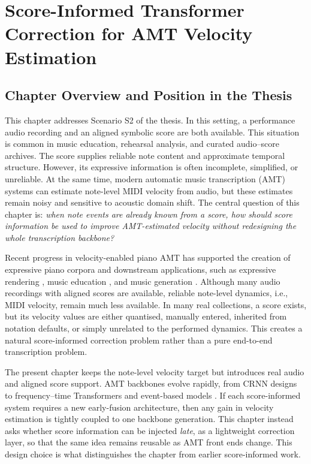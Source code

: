 \chapter{Score-Informed Transformer Correction for AMT Velocity Estimation}
\label{ch:scoreinf}

\section{Chapter Overview and Position in the Thesis}
\label{sec:scoreinf:overview}

This chapter addresses Scenario S2 of the thesis. In this setting, a performance audio recording and an aligned symbolic score are both available. This situation is common in music education, rehearsal analysis, and curated audio--score archives. The score supplies reliable note content and approximate temporal structure. However, its expressive information is often incomplete, simplified, or unreliable. At the same time, modern automatic music transcription (AMT) systems can estimate note-level MIDI velocity from audio, but these estimates remain noisy and sensitive to acoustic domain shift. The central question of this chapter is: \emph{when note events are already known from a score, how should score information be used to improve AMT-estimated velocity without redesigning the whole transcription backbone?}

Recent progress in velocity-enabled piano AMT has supported the creation of expressive piano corpora \cite{amt2019ov, hung2021emopia, kong2022giantMIDI, zhang2022atepp, edwards2023pijama} and downstream applications, such as expressive rendering \cite{zhang2024dexter}, music education \cite{zhang2025llaqo}, and music generation \cite{borovik2025symupe}. Although many audio recordings with aligned scores are available, reliable note-level dynamics, i.e., MIDI velocity, remain much less available. In many real collections, a score exists, but its velocity values are either quantised, manually entered, inherited from notation defaults, or simply unrelated to the performed dynamics. This creates a natural score-informed correction problem rather than a pure end-to-end transcription problem.

The present chapter keeps the note-level velocity target but introduces real audio and aligned score support. AMT backbones evolve rapidly, from CRNN designs to frequency--time Transformers and event-based models \cite{kong2021hpt,wei2022hppnet,toyama2023hft,yan2024semicrf}. If each score-informed system requires a new early-fusion architecture, then any gain in velocity estimation is tightly coupled to one backbone generation. This chapter instead asks whether score information can be injected \emph{late}, as a lightweight correction layer, so that the same idea remains reusable as AMT front ends change. This design choice is what distinguishes the chapter from earlier score-informed work.

